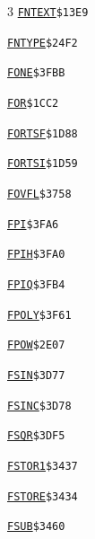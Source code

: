 \begin{multicols}{3}
\noindent\hyperlink{l:FNTEXT}{\texttt{FNTEXT}}\hfill\texttt{\$13E9~\phantom{000}\llap{\pageref{l:FNTEXT}}}\par
\noindent\hyperlink{l:FNTYPE}{\texttt{FNTYPE}}\hfill\texttt{\$24F2~\phantom{000}\llap{\pageref{l:FNTYPE}}}\par
\noindent\hyperlink{l:FONE}{\texttt{FONE}}\hfill\texttt{\$3FBB~\phantom{000}\llap{\pageref{l:FONE}}}\par
\noindent\hyperlink{l:FOR}{\texttt{FOR}}\hfill\texttt{\$1CC2~\phantom{000}\llap{\pageref{l:FOR}}}\par
\noindent\hyperlink{l:FORTSF}{\texttt{FORTSF}}\hfill\texttt{\$1D88~\phantom{000}\llap{\pageref{l:FORTSF}}}\par
\noindent\hyperlink{l:FORTSI}{\texttt{FORTSI}}\hfill\texttt{\$1D59~\phantom{000}\llap{\pageref{l:FORTSI}}}\par
\noindent\hyperlink{l:FOVFL}{\texttt{FOVFL}}\hfill\texttt{\$3758~\phantom{000}\llap{\pageref{l:FOVFL}}}\par
\noindent\hyperlink{l:FPI}{\texttt{FPI}}\hfill\texttt{\$3FA6~\phantom{000}\llap{\pageref{l:FPI}}}\par
\noindent\hyperlink{l:FPIH}{\texttt{FPIH}}\hfill\texttt{\$3FA0~\phantom{000}\llap{\pageref{l:FPIH}}}\par
\noindent\hyperlink{l:FPIQ}{\texttt{FPIQ}}\hfill\texttt{\$3FB4~\phantom{000}\llap{\pageref{l:FPIQ}}}\par
\noindent\hyperlink{l:FPOLY}{\texttt{FPOLY}}\hfill\texttt{\$3F61~\phantom{000}\llap{\pageref{l:FPOLY}}}\par
\noindent\hyperlink{l:FPOW}{\texttt{FPOW}}\hfill\texttt{\$2E07~\phantom{000}\llap{\pageref{l:FPOW}}}\par
\noindent\hyperlink{l:FSIN}{\texttt{FSIN}}\hfill\texttt{\$3D77~\phantom{000}\llap{\pageref{l:FSIN}}}\par
\noindent\hyperlink{l:FSINC}{\texttt{FSINC}}\hfill\texttt{\$3D78~\phantom{000}\llap{\pageref{l:FSINC}}}\par
\noindent\hyperlink{l:FSQR}{\texttt{FSQR}}\hfill\texttt{\$3DF5~\phantom{000}\llap{\pageref{l:FSQR}}}\par
\noindent\hyperlink{l:FSTOR1}{\texttt{FSTOR1}}\hfill\texttt{\$3437~\phantom{000}\llap{\pageref{l:FSTOR1}}}\par
\noindent\hyperlink{l:FSTORE}{\texttt{FSTORE}}\hfill\texttt{\$3434~\phantom{000}\llap{\pageref{l:FSTORE}}}\par
\noindent\hyperlink{l:FSUB}{\texttt{FSUB}}\hfill\texttt{\$3460~\phantom{000}\llap{\pageref{l:FSUB}}}\par

\end{multicols}

